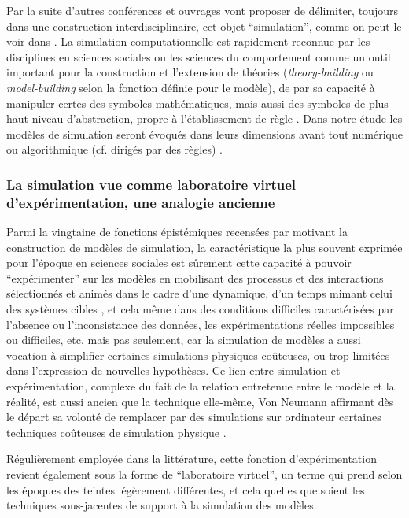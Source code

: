 Par la suite d'autres conférences et ouvrages vont proposer de délimiter, toujours dans une construction interdisciplinaire, cet objet \enquote{simulation}, comme on peut le voir dans \autocites{Guetzkow1962, Borko1962, Guetzkow1972, Dutton1971}. La simulation computationnelle est rapidement reconnue par les disciplines en sciences sociales ou les sciences du comportement comme un outil important pour la construction et l'extension de théories (\textit{theory-building} ou \textit{model-building} selon la fonction définie pour le modèle), de par sa capacité à manipuler certes des symboles mathématiques, mais aussi des symboles de plus haut niveau d'abstraction, propre à l'établissement de règle \autocite[924-925]{Clarkson1960}. Dans notre étude les modèles de simulation seront évoqués dans leurs dimensions avant tout numérique ou algorithmique (cf. dirigés par des règles) \autocite[36-38]{Varenne2013b}.

\subsubsection{La simulation vue comme laboratoire virtuel d'expérimentation, une analogie ancienne}
\label{ssec:labo_virtuelle}

Parmi la vingtaine de fonctions épistémiques recensées par \textcite[14-23]{Varenne2013b} motivant la construction de modèles de simulation, la caractéristique la plus souvent exprimée pour l'époque en sciences sociales est sûrement cette capacité à pouvoir \enquote{expérimenter} sur les modèles en mobilisant des processus et des interactions sélectionnés et animés dans le cadre d'une dynamique, d'un temps mimant celui des systèmes cibles , et cela même dans des conditions difficiles caractérisées par l'absence ou l'inconsistance des données, les expérimentations réelles impossibles ou difficiles, etc. mais pas seulement, car la simulation de modèles a aussi vocation à simplifier certaines simulations physiques coûteuses, ou trop limitées dans l'expression de nouvelles hypothèses. Ce lien entre simulation et expérimentation, complexe du fait de la relation entretenue entre le modèle et la réalité, est aussi ancien que la technique elle-même, Von Neumann affirmant dès le départ sa volonté de remplacer par des simulations sur ordinateur certaines techniques coûteuses de simulation physique \autocite[15]{Winsberg2013}.

Régulièrement employée dans la littérature, cette fonction d’expérimentation  revient également sous la forme de \enquote{laboratoire virtuel}, un terme qui prend selon les époques des teintes légèrement différentes, et cela quelles que soient les techniques sous-jacentes de support à la simulation des modèles.


